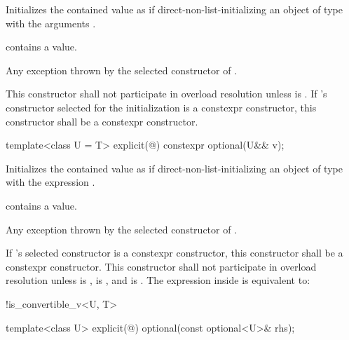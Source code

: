 \begin{itemdescr}
\pnum
\effects
Initializes the contained value as if direct-non-list-initializing an object of type  with the arguments .

\pnum
\ensures
{} contains a value.

\pnum
\throws
Any exception thrown by the selected constructor of .

\pnum
\remarks
This constructor shall not participate in overload resolution unless  is .
If 's constructor selected for the initialization is a constexpr constructor, this constructor shall be a constexpr constructor.
\end{itemdescr}

%
\begin{itemdecl}
template<class U = T> explicit(@\seebelow@) constexpr optional(U&& v);
\end{itemdecl}

\begin{itemdescr}
\pnum
\effects
Initializes the contained value as if direct-non-list-initializing
an object of type  with the expression .

\pnum
\ensures
{} contains a value.

\pnum
\throws
Any exception thrown by the selected constructor of .

\pnum
\remarks
If 's selected constructor is a constexpr constructor,
this constructor shall be a constexpr constructor.
This constructor shall not participate in overload resolution unless
 is ,
 is , and
 is .
The expression inside  is equivalent to:
\begin{codeblock}
!is_convertible_v<U, T>
\end{codeblock}
\end{itemdescr}

%
\begin{itemdecl}
template<class U> explicit(@\seebelow@) optional(const optional<U>& rhs);
\end{itemdecl}

